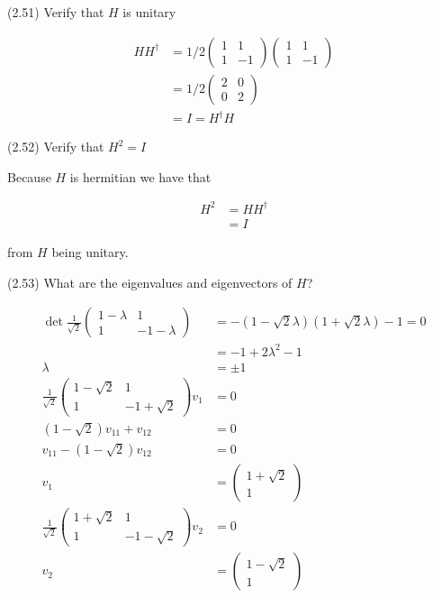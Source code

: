 \documentclass[main.tex]{subfiles}
\begin{document}
\begin{subappendices}
\begin{exercise}
(2.51) Verify that $H$ is unitary 

\begin{align*}
HH^\dag &= 1/2\begin{pmatrix} 1 & 1 \\ 1 & -1\end{pmatrix}\begin{pmatrix} 1 & 1 \\ 1 & -1\end{pmatrix} \\
&= 1/2\begin{pmatrix} 2 & 0 \\ 0 & 2 \end{pmatrix} \\
&= I = H^\dag H
\end{align*}
\end{exercise}

\begin{exercise}
(2.52) Verify that $H^2 = I$

Because $H$ is hermitian we have that 

\begin{align*}
H^2 &= HH^\dag \\
&= I
\end{align*}

from $H$ being unitary.
\end{exercise}

\begin{exercise}
(2.53) What are the eigenvalues and eigenvectors of $H$?

\begin{align*}
\det \frac{1}{\sqrt{2}}\begin{pmatrix} 1 - \lambda & 1 \\ 1 & -1 - \lambda\end{pmatrix}
&= -(1-\sqrt{2}\lambda)(1+\sqrt{2}\lambda) - 1 = 0 \\
&= -1 + 2\lambda^2 -1 \\
\lambda &= \pm 1 \\
\frac{1}{\sqrt{2}}\begin{pmatrix} 1-\sqrt{2} & 1 \\ 1 & -1 +\sqrt{2}\end{pmatrix}v_1 &= 0 \\
(1-\sqrt{2})v_{11} + v_{12} &= 0 \\
v_{11} -(1-\sqrt{2})v_{12} &= 0 \\
v_1 &= \begin{pmatrix} 1 + \sqrt{2} \\ 1\end{pmatrix} \\
\frac{1}{\sqrt{2}}\begin{pmatrix} 1+\sqrt{2} & 1 \\ 1 & -1 -\sqrt{2}\end{pmatrix}v_2 &= 0 \\ 
v_2 &= \begin{pmatrix} 1 - \sqrt{2} \\ 1\end{pmatrix}
\end{align*}
	

\end{exercise}
\end{subappendices}
\end{document}
